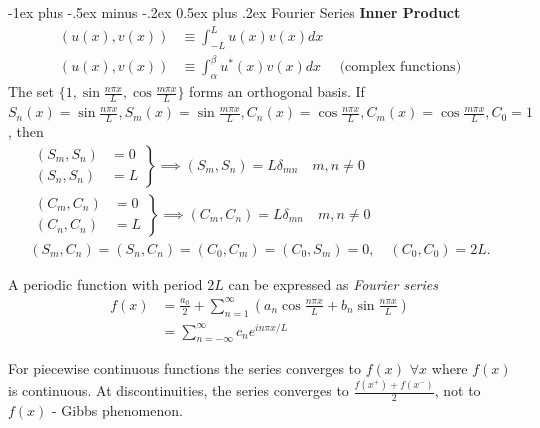 \documentclass[10pt,landscape]{article}
\makeatletter
\renewcommand{\section}{\@startsection{section}{1}{0mm}%
                                {-1ex plus -.5ex minus -.2ex}%
                                {0.5ex plus .2ex}%
                                {\normalfont\large\bfseries}}
\newcommand{\f}{\frac}
\makeatother
\begin{document}
\begin{multicols}{3}
\section{Fourier Series}  
	\textbf{Inner Product}  
	\begin{align*}
		(u(x),v(x)) &\equiv \int_{-L}^L u(x)v(x)dx \\
		(u(x),v(x)) &\equiv \int_{\alpha}^{\beta} u^*(x)v(x)dx \quad \text{ (complex functions)} 
        \end{align*}
        The set $ \{1,  \sin{\f{n \pi x}{L}}, \cos{\f{m \pi x}{L}} \} $ forms an orthogonal basis. If $S_n(x) = \sin{\f{n \pi x}{L}}, S_m(x) = \sin{\f{m \pi x}{L}}, C_n(x) = \cos{\f{n \pi x}{L}}, C_m(x) = \cos{\f{m \pi x}{L}}, C_0 = 1$, then 
        \begin{align*}
        		\left. \begin{array}{ll}
			(S_m,S_n) &= 0  \\
          		(S_n,S_n)&= L 
                \end{array}
              \right\} \implies (S_m,S_n) = L \delta_{mn} \quad m,n \neq 0 \\
          	\left. \begin{array}{ll}
			(C_m,C_n) &= 0 \\
           		(C_n,C_n) &= L 
                \end{array}
              \right\} \implies (C_m,C_n) = L \delta_{mn} \quad m,n \neq 0 \\
	(S_m,C_n) = (S_n, C_n) = (C_0,C_m) = (C_0,S_m) = 0, \quad (C_0,C_0) = 2L. \end{align*}

	A periodic function with period $2L$ can be expressed as \emph{Fourier series} 
	\begin{align*} 
		f(x) &= \f{a_0}{2} + \sum_{n=1}^{\infty} \left( a_n \cos{\f{n \pi x}{L}} + b_n \sin{\f{n \pi x}{L}} \right) \\
		 &= \sum_{n = - \infty}^{\infty} c_n e^{i n \pi x / L} 
	\end{align*}

	For piecewise continuous functions the series converges to $f(x)$ $\forall x$ where $f(x)$ is continuous. At discontinuities, the series converges to $ \f{f(x^+)+f(x^-)}{2}$, not to $f(x)$ - Gibbs phenomenon.


\end{multicols}
\end{document}
